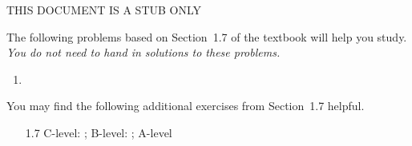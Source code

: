 \documentclass{article}
\title{\commonPSTitleZeroOneSeven}
\author{\commonAuthor}
\date{\commonDateZeroOneSeven}
\begin{document}
\maketitle
\thispagestyle{empty}

THIS DOCUMENT IS A STUB ONLY

\noindent
The following problems based on Section~1.7 of the textbook will help
you study.  \emph{You do not need to hand in solutions to these
  problems.}
\begin{enumerate}
\item 
\end{enumerate}

\noindent
You may find the following additional exercises from Section~1.7 helpful.
\begin{itemize}
\item[1.7] C-level: ; B-level: ; A-level 
\end{itemize}
\end{document}
